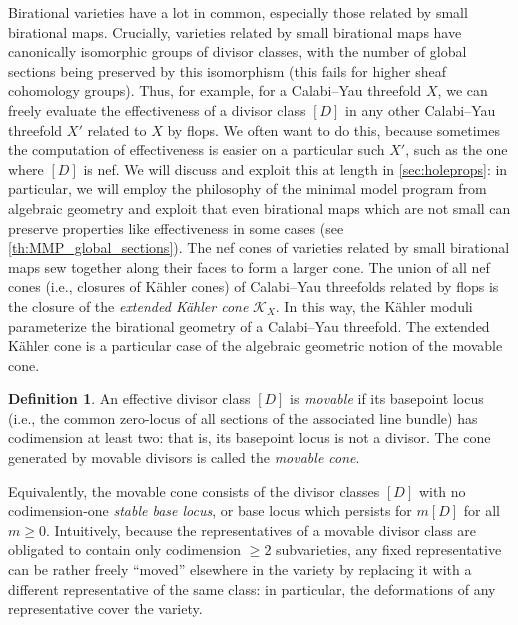 \documentclass[11pt,dvipsnames]{article}
\theoremstyle{definition}
\newtheorem{definition}[theorem]{Definition}
\begin{document}
Birational varieties have a lot in common, especially those related by small birational maps. Crucially, varieties related by small birational maps have canonically isomorphic groups of divisor classes, with the number of global sections being preserved by this isomorphism (this fails for higher sheaf cohomology groups). Thus, for example, for a Calabi--Yau threefold $X$, we can freely evaluate the effectiveness of a divisor class $[D]$ in any other Calabi--Yau threefold $X'$ related to $X$ by flops. We often want to do this, because sometimes the computation of effectiveness is easier on a particular such $X'$, such as the one where $[D]$ is nef. We will discuss and exploit this at length in \cref{sec:holeprops}: in particular, we will employ the philosophy of the minimal model program from algebraic geometry and exploit that even birational maps which are not small can preserve properties like effectiveness in some cases (see \cref{th:MMP_global_sections}). The nef cones of varieties related by small birational maps sew together along their faces to form a larger cone. The union of all nef cones (i.e., closures of K\"ahler cones) of Calabi--Yau threefolds related by flops is the closure of the \textit{extended K\"ahler cone} $\mathcal{K}_X$.
In this way, the K\"ahler moduli parameterize the birational geometry of a Calabi--Yau threefold. The extended K\"ahler cone is a particular case of the algebraic geometric notion of the movable cone.
\begin{definition}
    An effective divisor class $[D]$ is \textit{movable} if its basepoint locus (i.e., the common zero-locus of all sections of the associated line bundle) has codimension at least two: that is, its basepoint locus is not a divisor. The cone generated by movable divisors is called the \textit{movable cone}.
\end{definition}
Equivalently, the movable cone consists of the divisor classes $[D]$ with no codimension-one \textit{stable base locus}, or base locus which persists for $m[D]$ for all $m \geq 0$. Intuitively, because the representatives of a movable divisor class are obligated to contain only codimension $\geq 2$ subvarieties, any fixed representative can be rather freely ``moved'' elsewhere in the variety by replacing it with a different representative of the same class: in particular, the deformations of any representative cover the variety.
\end{document}
